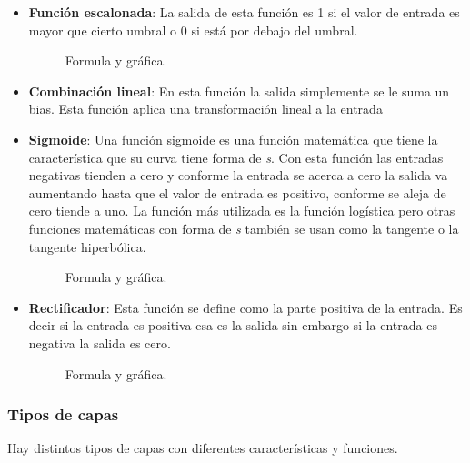 \documentclass[12pt,a4paper]{article}
\begin{document}
\begin{itemize}
\item \textbf{Función escalonada}: La salida de esta función es 1 si el valor de entrada es mayor que cierto umbral o 0 si está por debajo del umbral.
\begin{figure}[H]
\centering
{}%
\qquad
{}%
\caption{Formula y gráfica.}
\end{figure}

\item \textbf{Combinación lineal}: En esta función la salida simplemente se le suma un bias. Esta función aplica una transformación lineal a la entrada

\item \textbf{Sigmoide}: Una función sigmoide es una función matemática que tiene la característica que su curva tiene forma de \textit{s}. Con esta función las entradas negativas tienden a cero y conforme la entrada se acerca a cero la salida va aumentando hasta que el valor de entrada es positivo, conforme se aleja de cero tiende a uno. La función más utilizada es la función logística pero otras funciones matemáticas con forma de \textit{s} también se usan como la tangente o la tangente hiperbólica.
\begin{figure}[H]
\centering
{}%
\qquad
{}%
\caption{Formula y gráfica.}
\end{figure}

\item \textbf{Rectificador}: Esta función se define como la parte positiva de la entrada. Es decir si la entrada es positiva esa es la salida sin embargo si la entrada es negativa la salida es cero.
\begin{figure}[H]
\centering
{}%
\qquad
{}%
\caption{Formula y gráfica.}
\end{figure}

\end{itemize}

\subsubsection{Tipos de capas}
Hay distintos tipos de capas con diferentes características y funciones.
\end{document}
